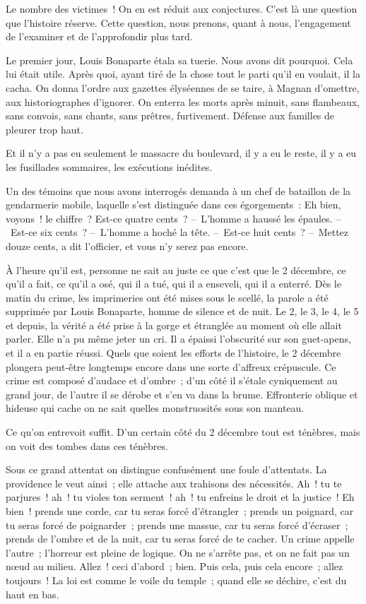 \documentclass[french,twoside]{book} %
\begin{document}
Le nombre des victimes ! On en est réduit aux conjectures. C’est là une question que l’histoire réserve. Cette question, nous prenons, quant à nous, l’engagement de l’examiner et de l’approfondir plus tard.\par
Le premier jour, Louis Bonaparte étala sa tuerie. Nous avons dit pourquoi. Cela lui était utile. Après quoi, ayant tiré de la chose tout le parti qu’il en voulait, il la cacha. On donna l’ordre aux gazettes élyséennes de se taire, à Magnan d’omettre, aux historiographes d’ignorer. On enterra les morts après minuit, sans flambeaux, sans convois, sans chants, sans prêtres, furtivement. Défense aux familles de pleurer trop haut.\par
Et il n’y a pas eu seulement le massacre du boulevard, il y a eu le reste, il y a eu les fusillades sommaires, les exécutions inédites.\par
Un des témoins que nous avons interrogés demanda à un chef de bataillon de la gendarmerie mobile, laquelle s’est distinguée dans ces égorgements : Eh bien, voyons ! le chiffre ? Est-ce quatre cents ? – L’homme a haussé les épaules. – Est-ce six cents ? – L’homme a hoché la tête. – Est-ce huit cents ? – Mettez douze cents, a dit l’officier, et vous n’y serez pas encore.\par
À l’heure qu’il est, personne ne sait au juste ce que c’est que le 2 décembre, ce qu’il a fait, ce qu’il a osé, qui il a tué, qui il a enseveli, qui il a enterré. Dès le matin du crime, les imprimeries ont été mises sous le scellé, la parole a été supprimée par Louis Bonaparte, homme de silence et de nuit. Le 2, le 3, le 4, le 5 et depuis, la vérité a été prise à la gorge et étranglée au moment où elle allait parler. Elle n’a pu même jeter un cri. Il a épaissi l’obscurité sur son guet-apens, et il a en partie réussi. Quels que soient les efforts de l’histoire, le 2 décembre plongera peut-être longtemps encore dans une sorte d’affreux crépuscule. Ce crime est composé d’audace et d’ombre ; d’un côté il s’étale cyniquement au grand jour, de l’autre il se dérobe et s’en va dans la brume. Effronterie oblique et hideuse qui cache on ne sait quelles monstruosités sous son manteau.\par
Ce qu’on entrevoit suffit. D’un certain côté du 2 décembre tout est ténèbres, mais on voit des tombes dans ces ténèbres.\par
Sous ce grand attentat on distingue confusément une foule d’attentats. La providence le veut ainsi ; elle attache aux trahisons des nécessités. Ah ! tu te parjures ! ah ! tu violes ton serment ! ah ! tu enfreins le droit et la justice ! Eh bien ! prends une corde, car tu seras forcé d’étrangler ; prends un poignard, car tu seras forcé de poignarder ; prends une massue, car tu seras forcé d’écraser ; prends de l’ombre et de la nuit, car tu seras forcé de te cacher. Un crime appelle l’autre ; l’horreur est pleine de logique. On ne s’arrête pas, et on ne fait pas un nœud au milieu. Allez ! ceci d’abord ; bien. Puis cela, puis cela encore ; allez toujours ! La loi est comme le voile du temple ; quand elle se déchire, c’est du haut en bas.\par
\end{document}
